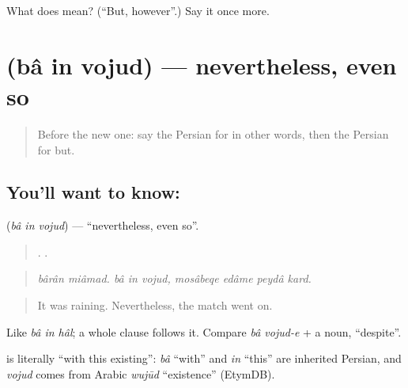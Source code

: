 \begin{tcolorbox}[breakable,colback=teal!4,colframe=teal!35!black,title={Before you move on}]
What does  mean? (\textquotedblleft{}But, however\textquotedblright{}.) Say it once more.
\end{tcolorbox}
\section[\texorpdfstring{\fa{با} \fa{این} \fa{وجود} (bâ in vojud)}{با این وجود (bâ in vojud)}]{   (bâ in vojud) — nevertheless, even so}

\label{lesson:FA-C367-ba-in-vojud}



\begin{quote}
Before the new one: say the Persian for in other words, then the Persian for but.
\end{quote}

\subsection*{You'll want to know:   }
\textbf{  } (\emph{bâ in vojud}) — \textquotedblleft{}nevertheless, even so\textquotedblright{}.

\begin{quote}
 .       .
\end{quote}

\begin{quote}
\emph{bârân miâmad. bâ in vojud, mosâbeqe edâme peydâ kard.}
\end{quote}

\begin{quote}
It was raining. Nevertheless, the match went on.
\end{quote}

Like \emph{bâ in hâl}; a whole clause follows it. Compare \emph{bâ vojud-e} + a noun, \textquotedblleft{}despite\textquotedblright{}.

\begin{cousinweb}
\textbf{  } is literally \textquotedblleft{}with this existing\textquotedblright{}: \emph{bâ} \textquotedblleft{}with\textquotedblright{} and \emph{in} \textquotedblleft{}this\textquotedblright{} are inherited Persian, and \emph{vojud} comes from Arabic \emph{wujūd} \textquotedblleft{}existence\textquotedblright{} (EtymDB).
\end{cousinweb}

